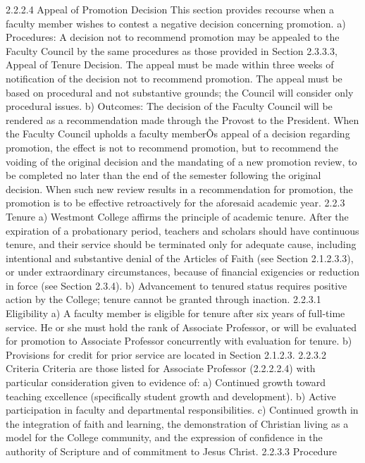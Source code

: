 \documentclass[letterpaper, 11pt]{article}
\begin{document}
	2.2.2.4 Appeal of Promotion Decision
	This section provides recourse when a faculty member wishes to contest a negative decision concerning promotion.
	a) Procedures:
	A decision not to recommend promotion may be appealed to the Faculty Council by the same procedures as those provided in Section 2.3.3.3, Appeal of Tenure Decision. The appeal must be made within three weeks of notification of the decision not to recommend promotion. The appeal must be based on procedural and not substantive grounds; the Council will consider only procedural issues.
	b) Outcomes:
	The decision of the Faculty Council will be rendered as a recommendation made through the Provost to the President. When the Faculty Council upholds a faculty memberÕs appeal of a decision regarding promotion, the effect is not to recommend promotion, but to recommend the voiding of the original decision and the mandating of a new promotion review, to be completed no later than the end of the semester following the original decision.  When such new review results in a recommendation for promotion, the promotion is to be effective retroactively for the aforesaid academic year.
	2.2.3 Tenure
	a) Westmont College affirms the principle of academic tenure.  After the expiration of a probationary period, teachers and scholars should have continuous tenure, and their service should be terminated only for adequate cause, including intentional and substantive denial of the Articles of Faith (see Section 2.1.2.3.3), or under extraordinary circumstances, because of financial exigencies or reduction in force (see Section 2.3.4).
	b) Advancement to tenured status requires positive action by the College; tenure cannot be granted through inaction.
	2.2.3.1 Eligibility
	a) A faculty member is eligible for tenure after six years of full-time service.  He or she must hold the rank of Associate Professor, or will be evaluated for promotion to Associate Professor concurrently with evaluation for tenure.
	b) Provisions for credit for prior service are located in Section 2.1.2.3.
	2.2.3.2 Criteria
	Criteria are those listed for Associate Professor (2.2.2.2.4) with particular consideration given to evidence of:
	a) Continued growth toward teaching excellence (specifically student growth and development).
	b) Active participation in faculty and departmental responsibilities.
	c) Continued growth in the integration of faith and learning, the demonstration of Christian living as a model for the College community, and the expression of confidence in the authority of Scripture and of commitment to Jesus Christ.
	2.2.3.3 Procedure
\end{document}

